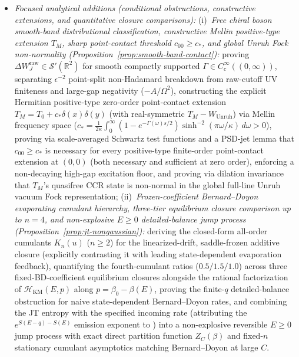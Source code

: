 \documentclass[11pt,a4paper]{article}
\theoremstyle{definition}
\theoremstyle{remark}
\newcommand{\bbR}{\mathbb{R}}
\newcommand{\1}{\mathbf{1}}
\begin{document}
\begin{enumerate}
\begin{itemize}
    \item[\textbf{(B)}] \emph{Focused analytical additions (conditional obstructions, constructive extensions, and quantitative closure comparisons):}
    (i)~\emph{Free chiral boson smooth-band distributional classification, constructive Mellin positive-type extension $T_M$, sharp point-contact threshold $c_{00}\ge c_*$, and global Unruh Fock non-normality (Proposition~\ref{prop:smooth-band-contact}):} proving $\Delta W_J^{\mathrm{raw}}\in\mathcal{S}'(\bbR^2)$ for smooth compactly supported $\Gamma\in C_c^\infty((0,\infty))$, separating $\epsilon^{-2}$ point-split non-Hadamard breakdown from raw-cutoff UV finiteness and large-gap negativity ($-A/\Omega^2$), constructing the explicit Hermitian positive-type zero-order point-contact extension $T_M = T_0 + c_*\delta(x)\delta(y)$ (with real-symmetric $T_M-W_{\mathrm{Unruh}}$) via Mellin frequency space ($c_* = \frac{1}{2\kappa}\int_0^\infty (1-e^{-\Gamma(\omega)s/2})\sinh^{-2}(\pi\omega/\kappa)\,d\omega > 0$), proving via scale-averaged Schwartz test functions and a PSD-jet lemma that $c_{00}\ge c_*$ is necessary for every positive-type finite-order point-contact extension at $(0,0)$ (both necessary and sufficient at zero order), enforcing a non-decaying high-gap excitation floor, and proving via dilation invariance that $T_M$'s quasifree CCR state is non-normal in the global full-line Unruh vacuum Fock representation;
    (ii)~\emph{Frozen-coefficient Bernard--Doyon evaporating cumulant hierarchy, three-tier equilibrium closure comparison up to $n=4$, and non-explosive $E\ge 0$ detailed-balance jump process (Proposition~\ref{prop:jt-nongaussian}):} deriving the closed-form all-order cumulants $K_n(u)$ ($n\ge 2$) for the linearized-drift, saddle-frozen additive closure (explicitly contrasting it with leading state-dependent evaporation feedback), quantifying the fourth-cumulant ratios ($0.5 / 1.5 / 1.0$) across three fixed-BD-coefficient equilibrium closures alongside the rational factorization of $\mathcal{H}_{\mathrm{KM}}(E,p)$ along $p=\beta_0-\beta(E)$, proving the finite-$q$ detailed-balance obstruction for naive state-dependent Bernard--Doyon rates, and combining the JT entropy with the specified incoming rate (attributing the $e^{S(E-q)-S(E)}$ emission exponent to \cite{MassarParentani2000,ParikhWilczek2000}) into a non-explosive reversible $E\ge 0$ jump process with exact direct partition function $Z_C(\beta)$ and fixed-$n$ stationary cumulant asymptotics matching Bernard--Doyon at large $C$.

\end{itemize}
\end{enumerate}
\end{document}
